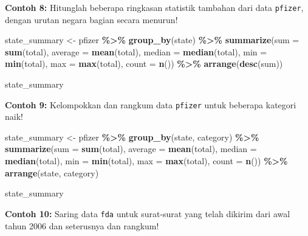 \documentclass[
]{book}
\newenvironment{Shaded}{\begin{snugshade}}{\end{snugshade}}
\newcommand{\AttributeTok}[1]{\textcolor[rgb]{0.13,0.29,0.53}{#1}}
\newcommand{\FunctionTok}[1]{\textcolor[rgb]{0.13,0.29,0.53}{\textbf{#1}}}
\newcommand{\NormalTok}[1]{#1}
\newcommand{\OtherTok}[1]{\textcolor[rgb]{0.56,0.35,0.01}{#1}}
\newcommand{\SpecialCharTok}[1]{\textcolor[rgb]{0.81,0.36,0.00}{\textbf{#1}}}
\begin{document}
\textbf{Contoh 8:} Hitunglah beberapa ringkasan statistik tambahan dari data \texttt{pfizer}, dengan urutan negara bagian secara menurun!

\begin{Shaded}
\begin{Highlighting}[]
\NormalTok{state\_summary }\OtherTok{\textless{}{-}}\NormalTok{ pfizer }\SpecialCharTok{\%\textgreater{}\%}
  \FunctionTok{group\_by}\NormalTok{(state) }\SpecialCharTok{\%\textgreater{}\%}
  \FunctionTok{summarize}\NormalTok{(}\AttributeTok{sum =} \FunctionTok{sum}\NormalTok{(total), }
        \AttributeTok{average =} \FunctionTok{mean}\NormalTok{(total), }
         \AttributeTok{median =} \FunctionTok{median}\NormalTok{(total),}
            \AttributeTok{min =} \FunctionTok{min}\NormalTok{(total),}
            \AttributeTok{max =} \FunctionTok{max}\NormalTok{(total),}
            \AttributeTok{count =} \FunctionTok{n}\NormalTok{()) }\SpecialCharTok{\%\textgreater{}\%}
  \FunctionTok{arrange}\NormalTok{(}\FunctionTok{desc}\NormalTok{(sum))}

\NormalTok{state\_summary}
\end{Highlighting}
\end{Shaded}

\textbf{Contoh 9:} Kelompokkan dan rangkum data \texttt{pfizer} untuk beberapa kategori naik!

\begin{Shaded}
\begin{Highlighting}[]
\NormalTok{state\_summary }\OtherTok{\textless{}{-}}\NormalTok{ pfizer }\SpecialCharTok{\%\textgreater{}\%}
  \FunctionTok{group\_by}\NormalTok{(state, category) }\SpecialCharTok{\%\textgreater{}\%}
  \FunctionTok{summarize}\NormalTok{(}\AttributeTok{sum =} \FunctionTok{sum}\NormalTok{(total), }
        \AttributeTok{average =} \FunctionTok{mean}\NormalTok{(total), }
         \AttributeTok{median =} \FunctionTok{median}\NormalTok{(total),}
            \AttributeTok{min =} \FunctionTok{min}\NormalTok{(total),}
            \AttributeTok{max =} \FunctionTok{max}\NormalTok{(total),}
            \AttributeTok{count =} \FunctionTok{n}\NormalTok{()) }\SpecialCharTok{\%\textgreater{}\%}
  \FunctionTok{arrange}\NormalTok{(state, category)}

\NormalTok{state\_summary}
\end{Highlighting}
\end{Shaded}

\textbf{Contoh 10:} Saring data \texttt{fda} untuk surat-surat yang telah dikirim dari awal tahun 2006 dan seterusnya dan rangkum!
\end{document}
